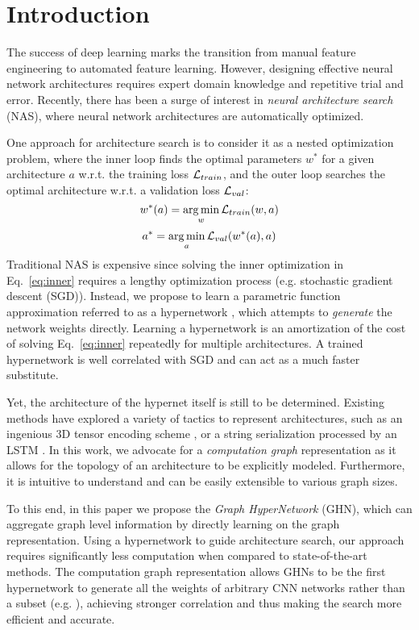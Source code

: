 \section{Introduction}
The success of deep learning marks the transition from manual feature engineering to automated
feature learning. However, designing effective neural network architectures requires expert domain
knowledge and repetitive trial and error. Recently, there has been a surge of interest in {\it
neural architecture search} (NAS), where neural network architectures are automatically optimized.

One approach for architecture search is to consider it as a nested optimization problem, where the
inner loop finds the optimal parameters $w^*$ for a given architecture $a$ w.r.t. the training loss
${\mathcal{L}}_{train}$, and the outer loop searches the optimal architecture w.r.t. a validation loss
${\mathcal{L}}_{val}$:
\begin{equation}
\label{eq:inner}
w^*(a) = \operatorname*{arg\,min}_w {\mathcal{L}}_{train}(w, a)
\end{equation}
\begin{equation}
\label{eq:outer}
a^* = \operatorname*{arg\,min}_a {\mathcal{L}}_{val}(w^*(a),a)
\end{equation}
Traditional NAS is expensive since solving the  inner optimization in Eq.~\ref{eq:inner}  requires a
lengthy optimization process (e.g. stochastic gradient descent (SGD)). Instead,  we propose to learn
a parametric function approximation referred to as a hypernetwork
\citep{ha2016hypernetworks,brock2017smash}, which attempts to \textit{generate} the network weights
directly.  Learning a hypernetwork is an amortization of the cost of solving Eq.~\ref{eq:inner}
repeatedly for multiple architectures. A trained hypernetwork is well correlated with SGD and can
act as a much faster substitute.

Yet, the architecture of the hypernet itself is still to be determined. Existing methods have
explored a variety of tactics to represent architectures, such as an ingenious 3D tensor encoding
scheme \citep{brock2017smash}, or a string serialization processed by an LSTM
\citep{zoph2016neural,zoph2017learning,pham2018efficient}. In this work, we advocate for a
\textit{computation graph} representation as it allows for the topology of an architecture to be
explicitly modeled. Furthermore, it is intuitive to understand and can be easily extensible to
various graph sizes.

To this end, in this paper we propose the \textit{Graph HyperNetwork} (GHN), which can aggregate
graph level information by directly learning on the graph representation. Using a hypernetwork to
guide architecture search, our approach requires significantly less computation when compared to
state-of-the-art methods. The computation graph representation allows GHNs to be the first
hypernetwork to generate all the weights of arbitrary CNN networks rather than a subset (e.g.
\cite{brock2017smash}), achieving stronger correlation and thus making the search more efficient and
accurate.

